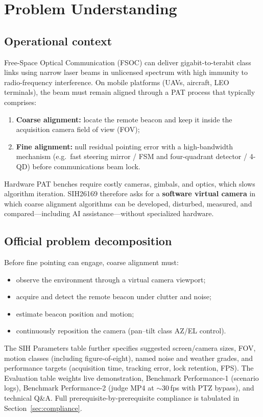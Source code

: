\documentclass[11pt,a4paper]{article}
\begin{document}
\tableofcontents
\newpage

\section{Problem Understanding}

\subsection{Operational context}
Free-Space Optical Communication (FSOC) can deliver gigabit-to-terabit class links using narrow laser beams in unlicensed spectrum with high immunity to radio-frequency interference.
On mobile platforms (UAVs, aircraft, LEO terminals), the beam must remain aligned through a PAT process that typically comprises:
\begin{enumerate}
  \item \textbf{Coarse alignment:} locate the remote beacon and keep it inside the acquisition camera field of view (FOV);
  \item \textbf{Fine alignment:} null residual pointing error with a high-bandwidth mechanism (e.g.\ fast steering mirror / FSM and four-quadrant detector / 4-QD) before communications beam lock.
\end{enumerate}
Hardware PAT benches require costly cameras, gimbals, and optics, which slows algorithm iteration.
SIH26169 therefore asks for a \textbf{software virtual camera} in which coarse alignment algorithms can be developed, disturbed, measured, and compared---including AI assistance---without specialized hardware.

\subsection{Official problem decomposition}
Before fine pointing can engage, coarse alignment must:
\begin{itemize}
  \item observe the environment through a virtual camera viewport;
  \item acquire and detect the remote beacon under clutter and noise;
  \item estimate beacon position and motion;
  \item continuously reposition the camera (pan--tilt class AZ/EL control).
\end{itemize}
The SIH Parameters table further specifies suggested screen/camera sizes, FOV, motion classes (including figure-of-eight), named noise and weather grades, and performance targets (acquisition time, tracking error, lock retention, FPS).
The Evaluation table weights live demonstration, Benchmark Performance-1 (scenario logs), Benchmark Performance-2 (judge MP4 at $\sim$30\,fps with PTZ bypass), and technical Q\&A.
Full prerequisite-by-prerequisite compliance is tabulated in Section~\ref{sec:compliance}.
\end{document}
